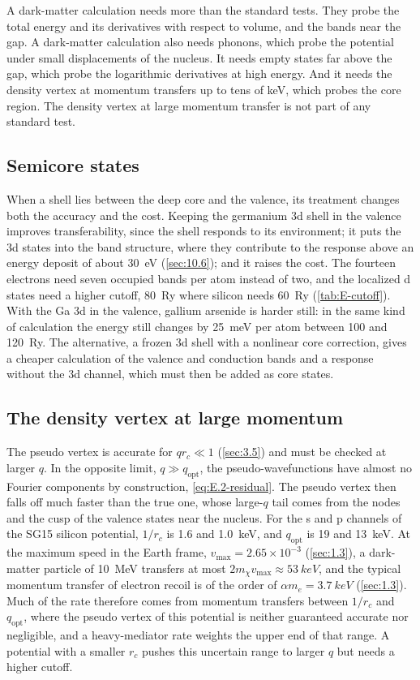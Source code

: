 A dark-matter calculation needs more than the standard tests. They probe the total energy and its derivatives with respect to volume, and the bands near the gap. A dark-matter calculation also needs phonons, which probe the potential under small displacements of the nucleus. It needs empty states far above the gap, which probe the logarithmic derivatives at high energy. And it needs the density vertex at momentum transfers up to tens of keV, which probes the core region. The density vertex at large momentum transfer is not part of any standard test.

\subsection{Semicore states}

When a shell lies between the deep core and the valence, its treatment changes both the accuracy and the cost. Keeping the germanium 3d shell in the valence improves transferability, since the shell responds to its environment; it puts the 3d states into the band structure, where they contribute to the response above an energy deposit of about \SI{30}{eV} (\cref{sec:10.6}); and it raises the cost. The fourteen electrons need seven occupied bands per atom instead of two, and the localized d states need a higher cutoff, \SI{80}{Ry} where silicon needs \SI{60}{Ry} (\cref{tab:E-cutoff}). With the Ga 3d in the valence, gallium arsenide is harder still: in the same kind of calculation the energy still changes by \SI{25}{meV} per atom between 100 and \SI{120}{Ry}. The alternative, a frozen 3d shell with a nonlinear core correction, gives a cheaper calculation of the valence and conduction bands and a response without the 3d channel, which must then be added as core states.

\subsection{The density vertex at large momentum}

The pseudo vertex is accurate for $qr_c \ll 1$ (\cref{sec:3.5}) and must be checked at larger $q$. In the opposite limit, $q \gg q_{\mathrm{opt}}$, the pseudo-wavefunctions have almost no Fourier components by construction, \cref{eq:E.2-residual}. The pseudo vertex then falls off much faster than the true one, whose large-$q$ tail comes from the nodes and the cusp of the valence states near the nucleus. For the s and p channels of the SG15 silicon potential, $1/r_c$ is 1.6 and \SI{1.0}{keV}, and $q_{\mathrm{opt}}$ is 19 and \SI{13}{keV}. At the maximum speed in the Earth frame, $v_{\mathrm{max}} = 2.65\times10^{-3}$ (\cref{sec:1.3}), a dark-matter particle of \SI{10}{MeV} transfers at most $2m_\chi v_{\mathrm{max}} \approx \SI{53}{keV}$, and the typical momentum transfer of electron recoil is of the order of $\alpha m_e = \SI{3.7}{keV}$ (\cref{sec:1.3}). Much of the rate therefore comes from momentum transfers between $1/r_c$ and $q_{\mathrm{opt}}$, where the pseudo vertex of this potential is neither guaranteed accurate nor negligible, and a heavy-mediator rate weights the upper end of that range. A potential with a smaller $r_c$ pushes this uncertain range to larger $q$ but needs a higher cutoff.


